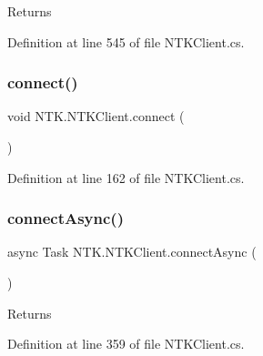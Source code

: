 \begin{DoxyReturn}{Returns}

\end{DoxyReturn}


Definition at line 545 of file N\+T\+K\+Client.\+cs.

\mbox{\label{class_n_t_k_1_1_n_t_k_client_a79e34c6bb05c45c1d1951e41d4dd3796}} 
\subsubsection{\texorpdfstring{connect()}{connect()}}
{\footnotesize\ttfamily void N\+T\+K.\+N\+T\+K\+Client.\+connect (\begin{DoxyParamCaption}{ }\end{DoxyParamCaption})}







Definition at line 162 of file N\+T\+K\+Client.\+cs.

\mbox{\label{class_n_t_k_1_1_n_t_k_client_ab0b12214618121588a44c4014b9c3744}} 
\subsubsection{\texorpdfstring{connectAsync()}{connectAsync()}}
{\footnotesize\ttfamily async Task N\+T\+K.\+N\+T\+K\+Client.\+connect\+Async (\begin{DoxyParamCaption}{ }\end{DoxyParamCaption})}





\begin{DoxyReturn}{Returns}

\end{DoxyReturn}


Definition at line 359 of file N\+T\+K\+Client.\+cs.

\mbox{\label{class_n_t_k_1_1_n_t_k_client_ad5b84d00ba712a8d999dacaa53931ccd}} 
